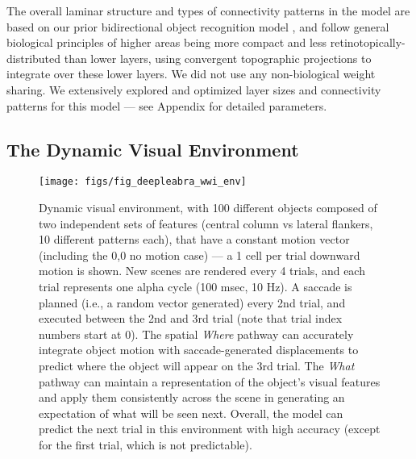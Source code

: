 \documentclass[11pt,twoside]{article}
\newif\myifpdf
\begin{document}
The overall laminar structure and types of connectivity patterns in the model are based on our prior bidirectional object recognition model \cite{OReillyWyatteHerdEtAl13}, and follow general biological principles of higher areas being more compact and less retinotopically-distributed than lower layers, using convergent topographic projections to integrate over these lower layers. We did not use any non-biological weight sharing.  We extensively explored and optimized layer sizes and connectivity patterns for this model --- see Appendix for detailed parameters.

\subsection{The Dynamic Visual Environment}

\begin{figure}
  \centering\texttt{[image: figs/fig\_deepleabra\_wwi\_env]}
  \caption{\footnotesize Dynamic visual environment, with 100 different objects composed of two independent sets of features (central column vs lateral flankers, 10 different patterns each), that have a constant motion vector (including the 0,0 no motion case) --- a 1 cell per trial downward motion is shown.  New scenes are rendered every 4 trials, and each trial represents one alpha cycle (100 msec, 10 Hz). A saccade is planned (i.e., a random vector generated) every 2nd trial, and executed between the 2nd and 3rd trial (note that trial index numbers start at 0).  The spatial {\em Where} pathway can accurately integrate object motion with saccade-generated displacements to predict where the object will appear on the 3rd trial.  The {\em What} pathway can maintain a representation of the object's visual features and apply them consistently across the scene in generating an expectation of what will be seen next.  Overall, the model can predict the next trial in this environment with high accuracy (except for the first trial, which is not predictable).}
  \label{fig.wwi_env}
\end{figure}
\end{document}
